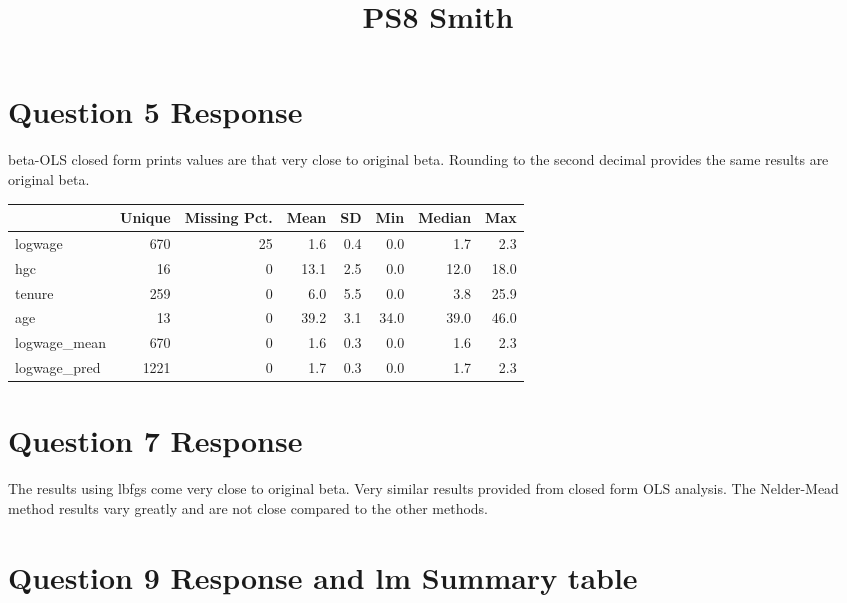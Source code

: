 \documentclass{article}
\title{PS8 Smith}
\begin{document}
\maketitle

\section{Question 5 Response}
beta-OLS closed form prints values are that very close to original beta. Rounding to the second decimal provides the same results are original beta.

\begin{table}[h!]
\centering
\footnotesize
\begin{tabular}[T]{lrrrrrrr}
\toprule
& Unique & Missing Pct. & Mean & SD & Min & Median & Max\\
\midrule
logwage & 670 & 25 & \num{1.6} & \num{0.4} & \num{0.0} & \num{1.7} & \num{2.3}\\
hgc & 16 & 0 & \num{13.1} & \num{2.5} & \num{0.0} & \num{12.0} & \num{18.0}\\
tenure & 259 & 0 & \num{6.0} & \num{5.5} & \num{0.0} & \num{3.8} & \num{25.9}\\
age & 13 & 0 & \num{39.2} & \num{3.1} & \num{34.0} & \num{39.0} & \num{46.0}\\
logwage\_mean & 670 & 0 & \num{1.6} & \num{0.3} & \num{0.0} & \num{1.6} & \num{2.3}\\
logwage\_pred & 1221 & 0 & \num{1.7} & \num{0.3} & \num{0.0} & \num{1.7} & \num{2.3}\\
\bottomrule
\end{tabular}
\end{table}
\section{Question 7 Response}
The results using lbfgs come very close to original beta. Very similar results provided from closed form OLS analysis. The Nelder-Mead method results vary greatly and are not close compared to the other methods.
\section{Question 9 Response and lm Summary table}
\end{document}
